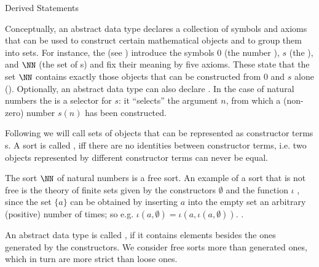 \begin{omgroup}{Derived Statements}
\begin{module}[id=adt]
\begin{omgroup}[id=adt,short=Abstract Data Types]
\begin{module}[id=adt]
Conceptually, an abstract data type declares a collection of symbols and axioms that can
be used to construct certain mathematical objects and to group them into sets. For
instance, the {} (see {}) introduce the symbols $0$
(the number {}), $s$ (the {}), and $\NN$ (the
set of {s}) and fix their meaning by five axioms. These state
that the set $\NN$ contains exactly those objects that can be constructed from $0$ and $s$
alone (). Optionally, an abstract data type can
also declare . In the case of natural numbers the {} is a
selector for $s$: it ``selects'' the argument $n$, from which a (non-zero) number $s(n)$
has been constructed.

\begin{definition}[display=flow,id=free.def]
  Following {\casl} we will call sets of objects that can be represented as constructor
  terms {s}. A sort is called {}, iff there are no identities
  between constructor terms, i.e.  two objects represented by different constructor terms
  can never be equal.
\end{definition}
The sort $\NN$ of natural numbers is a free sort. An example of a sort that is not free is
the theory of finite sets given by the constructors $\emptyset$ and the
{} function $\iota$ , since the set $\{a\}$ can be obtained by
inserting $a$ into the empty set an arbitrary (positive) number of times; so
e.g. $\iota(a,\emptyset)=\iota(a,\iota(a,\emptyset))$. . 
\begin{definition}[display=flow,id=generated.def]
  An abstract data type is called {}, if it contains elements besides the
  ones generated by the constructors. We consider free sorts more {} than
  generated ones, which in turn are more strict than loose ones.
\end{definition}


\end{module}
\end{omgroup}
\end{module}
\end{omgroup}

